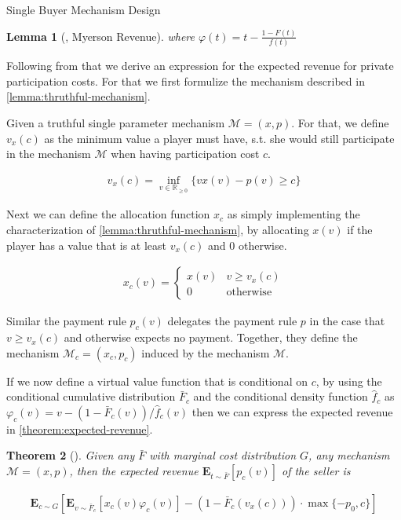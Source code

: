 \documentclass[11pt,a4paper]{article}
\newtheorem{theorem}{Theorem}
\newtheorem{lemma}[theorem]{Lemma}
\newcommand{\RR}{\ensuremath{\mathbb{R}}}
\newcommand{\1}[1]{\mbox{\rm\bf 1}_{#1}}
\begin{document}
\begin{section}{Single Buyer Mechanism Design}
\begin{lemma}[\cite{myerson}, Myerson Revenue]
     where $\varphi(t) = t - \frac{1 - F(t)}{f(t)}$
 \end{lemma}

 Following from that we derive an expression for the expected revenue for private participation costs.
 For that we first formulize the mechanism described in \autoref{lemma:thruthful-mechanism}.

 Given a truthful single parameter mechanism $\mathcal{M}=(x,p)$.
 For that, we define $v_x(c)$ as the minimum value a player must have, s.t. she would still participate in the mechanism $\mathcal{M}$ when having participation cost $c$.

 \begin{align*}
     v_x(c) = \inf_{v \in \RR_{\geq 0}} \{vx(v) - p(v) \geq c\}
 \end{align*}

 Next we can define the allocation function $x_c$ as simply implementing the characterization of \autoref{lemma:thruthful-mechanism},
 by allocating $x(v)$ if the player has a value that is at least $v_x(c)$ and $0$ otherwise.

 \begin{align*}
     x_c(v) = \begin{cases}
                  x(v) & v \geq v_x(c)    \\
                  0    & \text{otherwise}
              \end{cases}
 \end{align*}

 Similar the payment rule $p_c(v)$ delegates the payment rule $p$ in the case that $v \geq v_x(c)$ and otherwise expects no payment.
 Together, they define the mechanism $\mathcal{M}_c = (x_c, p_c)$ induced by the mechanism $\mathcal{M}$.

 If we now define a virtual value function that is conditional on $c$, by using the conditional cumulative distribution $\bar{F}_c$ and the conditional density function $\hat{f}_c$ as
 $\varphi_c(v) = v - (1- \bar{F}_c(v)) / \hat{f}_c(v)$ then we can express the expected revenue in \autoref{theorem:expected-revenue}.

 \begin{theorem}[\cite{primary}]
     \label{theorem:expected-revenue}
     Given any $\bar{F}$ with marginal cost distribution $G$, any mechanism $\mathcal{M}=(x,p)$, then the expected revenue $\mathbf{E}_{t \sim \bar{F}}\left[p_c(v)\right]$ of the seller is

     \begin{align*}
         \mathbf{E}_{c \sim G}\left[\mathbf{E}_{v\sim\bar{F}_c}\left[x_c(v)\varphi_c(v)\right] - (1-\bar{F}_c(v_x(c))) \cdot \max\{-p_0,c\}\right]
     \end{align*}
 \end{theorem}


\end{section}
\end{document}
